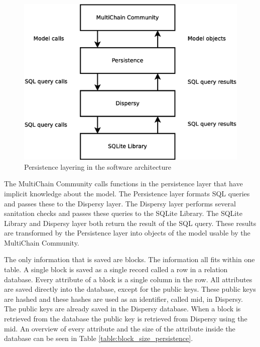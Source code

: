 \begin{figure}
	\centerline{\includegraphics[scale=0.3]{design/figs/persistence-layer.eps}}
	\caption{Persistence layering in the software architecture}
	\label{fig:persistence-layer}
\end{figure}

The MultiChain Community calls functions in the persistence layer that have implicit knowledge about the model.
The Persistence layer formats SQL queries and passes these to the Dispersy layer.
The Dispersy layer performs several sanitation checks and passes these queries to the SQLite Library.
The SQLite Library and Dispersy layer both return the result of the SQL query.
These results are transformed by the Persistence layer into objects of the model usable by the MultiChain Community.

The only information that is saved are blocks.
The information all fits within one table.
A single block is saved as a single record called a row in a relation database.
Every attribute of a block is a single column in the row.
All attributes are saved directly into the database,
except for the public keys.
These public keys are hashed and these hashes are used as an identifier, called mid, in Dispersy.
The public keys are already saved in the Dispersy database.
When a block is retrieved from the database the public key is retrieved from Dispersy using the mid.
An overview of every attribute and the size of the attribute inside the database can be seen in Table \ref{table:block_size_persistence}.

